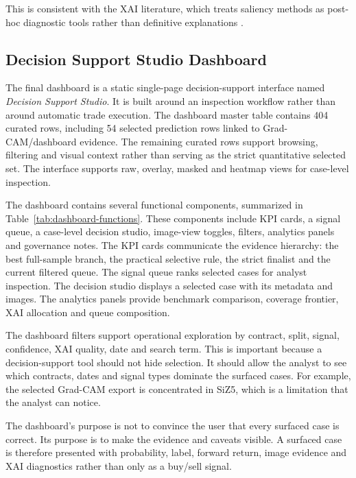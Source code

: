This is consistent with the XAI literature, which treats saliency methods as post-hoc diagnostic tools rather than definitive explanations \cite{selvaraju_gradcam,adebayo_sanity_checks,arrieta_xai,rudin_black_boxes}.

\subsection{Decision Support Studio Dashboard}
\label{subsec:dashboard}





The final dashboard is a static single-page decision-support interface named \emph{Decision Support Studio}. It is built around an inspection workflow rather than around automatic trade execution. The dashboard master table contains 404 curated rows, including 54 selected prediction rows linked to Grad-CAM/dashboard evidence. The remaining curated rows support browsing, filtering and visual context rather than serving as the strict quantitative selected set. The interface supports raw, overlay, masked and heatmap views for case-level inspection.

The dashboard contains several functional components, summarized in Table~\ref{tab:dashboard-functions}. These components include KPI cards, a signal queue, a case-level decision studio, image-view toggles, filters, analytics panels and governance notes. The KPI cards communicate the evidence hierarchy: the best full-sample branch, the practical selective rule, the strict finalist and the current filtered queue. The signal queue ranks selected cases for analyst inspection. The decision studio displays a selected case with its metadata and images. The analytics panels provide benchmark comparison, coverage frontier, XAI allocation and queue composition.

The dashboard filters support operational exploration by contract, split, signal, confidence, XAI quality, date and search term. This is important because a decision-support tool should not hide selection. It should allow the analyst to see which contracts, dates and signal types dominate the surfaced cases. For example, the selected Grad-CAM export is concentrated in SiZ5, which is a limitation that the analyst can notice.

The dashboard's purpose is not to convince the user that every surfaced case is correct. Its purpose is to make the evidence and caveats visible. A surfaced case is therefore presented with probability, label, forward return, image evidence and XAI diagnostics rather than only as a buy/sell signal.

